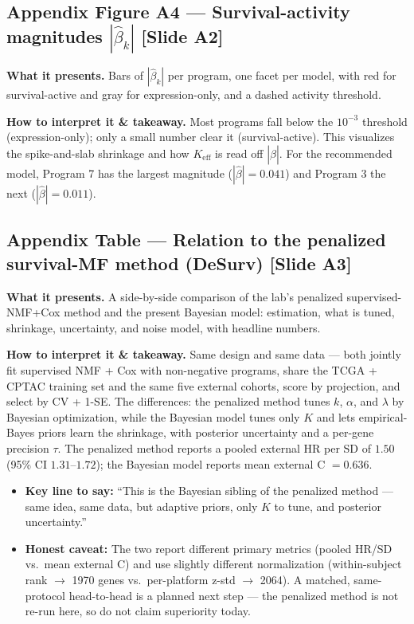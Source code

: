 \documentclass[11pt]{article}
\newcommand{\sectionlabel}[1]{\textbf{#1}}
\begin{document}
\subsection*{Appendix Figure A4 --- Survival-activity magnitudes $|\hat\beta_k|$ [Slide A2]}
\sectionlabel{What it presents.} Bars of $|\hat\beta_k|$ per program, one facet per model, with red
for survival-active and gray for expression-only, and a dashed activity threshold.

\sectionlabel{How to interpret it \& takeaway.} Most programs fall below the $10^{-3}$ threshold
(expression-only); only a small number clear it (survival-active). This visualizes the
spike-and-slab shrinkage and how $K_{\text{eff}}$ is read off $|\hat\beta|$. For the recommended
model, Program 7 has the largest magnitude ($|\hat\beta| = 0.041$) and Program 3 the next
($|\hat\beta| = 0.011$).

\subsection*{Appendix Table --- Relation to the penalized survival-MF method (DeSurv) [Slide A3]}
\sectionlabel{What it presents.} A side-by-side comparison of the lab's penalized supervised-NMF+Cox
method and the present Bayesian model: estimation, what is tuned, shrinkage, uncertainty, and noise
model, with headline numbers.

\sectionlabel{How to interpret it \& takeaway.} Same design and same data --- both jointly fit
supervised NMF + Cox with non-negative programs, share the TCGA + CPTAC training set and the same
five external cohorts, score by projection, and select by CV + 1-SE. The differences: the penalized
method tunes $k$, $\alpha$, and $\lambda$ by Bayesian optimization, while the Bayesian model tunes
only $K$ and lets empirical-Bayes priors learn the shrinkage, with posterior uncertainty and a
per-gene precision $\tau$. The penalized method reports a pooled external HR per SD of $1.50$ (95\%
CI $1.31$--$1.72$); the Bayesian model reports mean external C $= 0.636$.

\begin{itemize}
\item \sectionlabel{Key line to say:} ``This is the Bayesian sibling of the penalized method --- same
idea, same data, but adaptive priors, only $K$ to tune, and posterior uncertainty.''
\item \sectionlabel{Honest caveat:} The two report different primary metrics (pooled HR/SD vs.\ mean
external C) and use slightly different normalization (within-subject rank $\to$ 1970 genes vs.\
per-platform z-std $\to$ 2064). A matched, same-protocol head-to-head is a planned next step --- the
penalized method is not re-run here, so do not claim superiority today.
\end{itemize}
\end{document}
